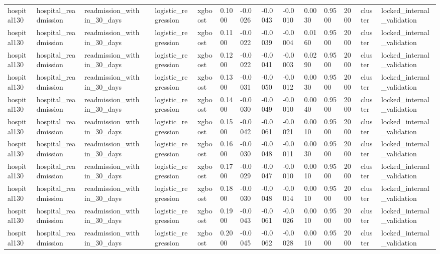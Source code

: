 \begin{tabular}{lllllllllllllll}
hospital130 & hospital\_readmission & readmission\_within\_30\_days &  & logistic\_regression & xgboost & 0.1000 & -0.0026 & -0.0043 & -0.0010 & 0.0030 & 0.9500 & 2000 & cluster & locked\_internal\_validation \\
hospital130 & hospital\_readmission & readmission\_within\_30\_days &  & logistic\_regression & xgboost & 0.1100 & -0.0022 & -0.0039 & -0.0004 & 0.0160 & 0.9500 & 2000 & cluster & locked\_internal\_validation \\
hospital130 & hospital\_readmission & readmission\_within\_30\_days &  & logistic\_regression & xgboost & 0.1200 & -0.0022 & -0.0041 & -0.0003 & 0.0290 & 0.9500 & 2000 & cluster & locked\_internal\_validation \\
hospital130 & hospital\_readmission & readmission\_within\_30\_days &  & logistic\_regression & xgboost & 0.1300 & -0.0031 & -0.0050 & -0.0012 & 0.0030 & 0.9500 & 2000 & cluster & locked\_internal\_validation \\
hospital130 & hospital\_readmission & readmission\_within\_30\_days &  & logistic\_regression & xgboost & 0.1400 & -0.0030 & -0.0049 & -0.0010 & 0.0040 & 0.9500 & 2000 & cluster & locked\_internal\_validation \\
hospital130 & hospital\_readmission & readmission\_within\_30\_days &  & logistic\_regression & xgboost & 0.1500 & -0.0042 & -0.0061 & -0.0021 & 0.0010 & 0.9500 & 2000 & cluster & locked\_internal\_validation \\
hospital130 & hospital\_readmission & readmission\_within\_30\_days &  & logistic\_regression & xgboost & 0.1600 & -0.0030 & -0.0048 & -0.0011 & 0.0030 & 0.9500 & 2000 & cluster & locked\_internal\_validation \\
hospital130 & hospital\_readmission & readmission\_within\_30\_days &  & logistic\_regression & xgboost & 0.1700 & -0.0029 & -0.0047 & -0.0010 & 0.0010 & 0.9500 & 2000 & cluster & locked\_internal\_validation \\
hospital130 & hospital\_readmission & readmission\_within\_30\_days &  & logistic\_regression & xgboost & 0.1800 & -0.0030 & -0.0048 & -0.0014 & 0.0010 & 0.9500 & 2000 & cluster & locked\_internal\_validation \\
hospital130 & hospital\_readmission & readmission\_within\_30\_days &  & logistic\_regression & xgboost & 0.1900 & -0.0043 & -0.0061 & -0.0026 & 0.0010 & 0.9500 & 2000 & cluster & locked\_internal\_validation \\
hospital130 & hospital\_readmission & readmission\_within\_30\_days &  & logistic\_regression & xgboost & 0.2000 & -0.0045 & -0.0062 & -0.0028 & 0.0010 & 0.9500 & 2000 & cluster & locked\_internal\_validation \\

\end{tabular}
